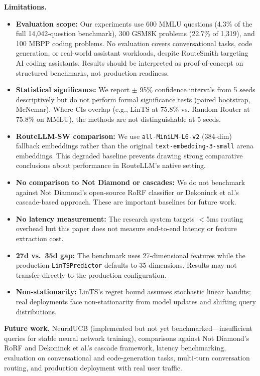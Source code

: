 \textbf{Limitations.}
\begin{itemize}
    \item \textbf{Evaluation scope:} Our experiments use 600 MMLU questions (4.3\% of the full 14,042-question benchmark), 300 GSM8K problems (22.7\% of 1,319), and 100 MBPP coding problems. No evaluation covers conversational tasks, code generation, or real-world assistant workloads, despite RouteSmith targeting AI coding assistants. Results should be interpreted as proof-of-concept on structured benchmarks, not production readiness.
    \item \textbf{Statistical significance:} We report $\pm$ 95\% confidence intervals from 5 seeds descriptively but do not perform formal significance tests (paired bootstrap, McNemar). Where CIs overlap (e.g., LinTS at 75.8\% vs. Random Router at 75.8\% on MMLU), the methods are not distinguishable at 5 seeds.
    \item \textbf{RouteLLM-SW comparison:} We use \texttt{all-MiniLM-L6-v2} (384-dim) fallback embeddings rather than the original \texttt{text-embedding-3-small} arena embeddings. This degraded baseline prevents drawing strong comparative conclusions about performance in RouteLLM's native setting.
    \item \textbf{No comparison to Not Diamond or cascades:} We do not benchmark against Not Diamond's open-source RoRF classifier or Dekoninck et al.'s cascade-based approach. These are important baselines for future work.
    \item \textbf{No latency measurement:} The research system targets $<$5ms routing overhead but this paper does not measure end-to-end latency or feature extraction cost.
    \item \textbf{27d vs.\ 35d gap:} The benchmark uses 27-dimensional features while the production \texttt{LinTSPredictor} defaults to 35 dimensions. Results may not transfer directly to the production configuration.
    \item \textbf{Non-stationarity:} LinTS's regret bound assumes stochastic linear bandits; real deployments face non-stationarity from model updates and shifting query distributions.
\end{itemize}

\textbf{Future work.} NeuralUCB (implemented but not yet benchmarked---insufficient queries for stable neural network training), comparisons against Not Diamond's RoRF and Dekoninck et al.'s cascade framework, latency benchmarking, evaluation on conversational and code-generation tasks, multi-turn conversation routing, and production deployment with real user traffic.
